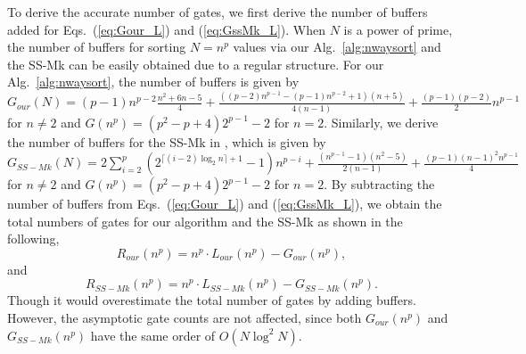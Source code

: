 \documentclass[10pt,journal,cspaper,compsoc]{IEEEtran}
\begin{document}
To derive the accurate number of gates, we first derive the number of buffers added for Eqs.~(\ref{eq:Gour_L}) and (\ref{eq:GssMk_L}).
When $N$ is a power of prime, the number of buffers for sorting $N=n^p$ values via our Alg.~\ref{alg:nwaysort} and the SS-Mk \cite{gao1997sloping} can be easily obtained due to a regular structure.
For our Alg.~\ref{alg:nwaysort}, the number of buffers is given by $G_{our}(N) = (p-1)n^{p-2}\frac{n^2+6n-5}{4} + \frac{((p-2)n^{p-1} - (p-1)n^{p-2} + 1)(n+5)}{4(n-1)} + \frac{(p-1)(p-2)}{2}n^{p-1}$ for $n\neq 2$ and $G(n^p) = (p^2-p+4)2^{p-1}-2$ for $n=2$. Similarly, we derive the number of buffers for the SS-Mk in \cite{gao1997sloping}, which is given by $G_{SS-Mk}(N) = 2\sum^p_{i=2}(2^{\lceil (i-2)\log_2 n \rceil + 1} -1)n^{p-i} + \frac{(n^{p-1}-1)(n^2-5)}{2(n-1)} + \frac{(p-1)(n-1)^2 n^{p-1}}{4}$ for $n\neq 2$ and $G(n^p) = (p^2-p+4)2^{p-1}-2$ for $n=2$.
By subtracting the number of buffers from Eqs.~(\ref{eq:Gour_L}) and (\ref{eq:GssMk_L}), we obtain the total numbers of gates for our algorithm and the SS-Mk as shown in the following,
\begin{equation}
R_{our}(n^p) = n^p \cdot L_{our}(n^p) - G_{our}(n^p),
\label{eq:GBour_L}
\end{equation}
and
\begin{equation}
R_{SS-Mk}(n^p) = n^p \cdot L_{SS-Mk}(n^p) - G_{SS-Mk}(n^p).
\label{eq:GBssMk_L}
\end{equation}
Though it would overestimate the total number of gates by adding buffers. However, the asymptotic gate counts are not affected, since both $G_{our}(n^p)$ and $G_{SS-Mk}(n^p)$ have the same order of $O(N \log^2 N)$.
\end{document}
